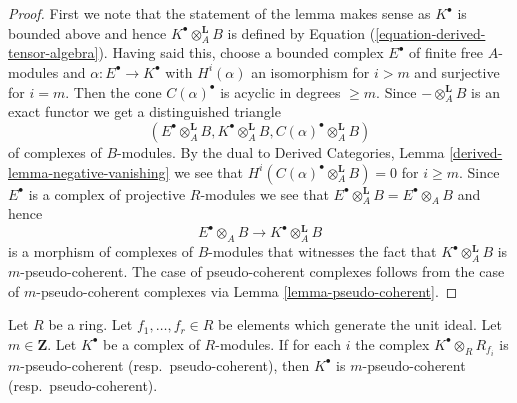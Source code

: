 \begin{proof}
First we note that the statement of the lemma makes sense as
$K^\bullet$ is bounded above and hence $K^\bullet \otimes_A^{\mathbf{L}} B$
is defined by Equation (\ref{equation-derived-tensor-algebra}).
Having said this, choose a bounded complex $E^\bullet$
of finite free $A$-modules and $\alpha : E^\bullet \to K^\bullet$
with $H^i(\alpha)$ an isomorphism for $i > m$ and surjective for
$i = m$. Then the cone $C(\alpha)^\bullet$ is acyclic in degrees
$\geq m$. Since $-\otimes_A^{\mathbf{L}} B$ is an exact functor
we get a distinguished triangle
$$
(E^\bullet \otimes_A^{\mathbf{L}} B, K^\bullet \otimes_A^{\mathbf{L}} B,
C(\alpha)^\bullet \otimes_A^{\mathbf{L}} B)
$$
of complexes of $B$-modules. By the dual to
Derived Categories, Lemma \ref{derived-lemma-negative-vanishing}
we see that $H^i(C(\alpha)^\bullet \otimes_A^{\mathbf{L}} B) = 0$
for $i \geq m$. Since $E^\bullet$ is a complex of projective $R$-modules
we see that $E^\bullet \otimes_A^{\mathbf{L}} B = E^\bullet \otimes_A B$
and hence
$$
E^\bullet \otimes_A B
\longrightarrow
K^\bullet \otimes_A^{\mathbf{L}} B
$$
is a morphism of complexes of $B$-modules that witnesses the
fact that $K^\bullet \otimes_A^{\mathbf{L}} B$ is $m$-pseudo-coherent.
The case of pseudo-coherent complexes follows from the case
of $m$-pseudo-coherent complexes via
Lemma \ref{lemma-pseudo-coherent}.
\end{proof}

\begin{lemma}
\label{lemma-glue-pseudo-coherent}
Let $R$ be a ring. Let $f_1, \ldots, f_r \in R$ be elements which
generate the unit ideal. Let $m \in \mathbf{Z}$. Let $K^\bullet$
be a complex of $R$-modules. If for each $i$ the complex
$K^\bullet \otimes_R R_{f_i}$ is $m$-pseudo-coherent
(resp.\ pseudo-coherent), then $K^\bullet$ is $m$-pseudo-coherent
(resp.\ pseudo-coherent).
\end{lemma}

